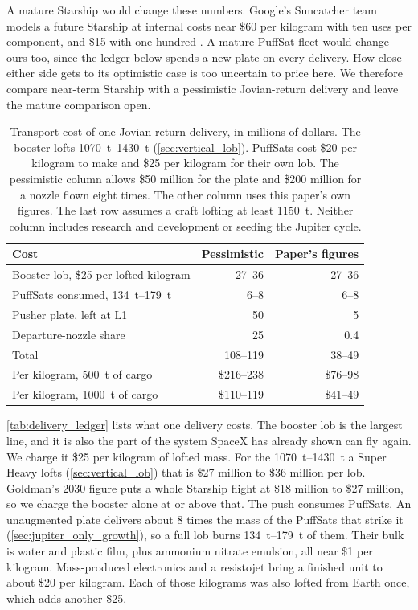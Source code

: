 \documentclass{article}
\begin{document}
A mature Starship would change these numbers. Google's Suncatcher team models a future Starship at internal costs near \$60 per kilogram with ten uses per component, and \$15 with one hundred \cite{aguera2026_suncatcher}. A mature PuffSat fleet would change ours too, since the ledger below spends a new plate on every delivery. How close either side gets to its optimistic case is too uncertain to price here. We therefore compare near-term Starship with a pessimistic Jovian-return delivery and leave the mature comparison open.

\begin{table}[!htpb]
    \centering
    \caption{Transport cost of one Jovian-return delivery, in millions of dollars. The booster lofts \SIrange{1070}{1430}{\tonne} (\autoref{sec:vertical_lob}). PuffSats cost \$20 per kilogram to make and \$25 per kilogram for their own lob. The pessimistic column allows \$50 million for the plate and \$200 million for a nozzle flown eight times. The other column uses this paper's own figures. The last row assumes a craft lofting at least \SI{1150}{\tonne}. Neither column includes research and development or seeding the Jupiter cycle.}
    \label{tab:delivery_ledger}
    \begin{tabular}{|l|r|r|}\hline
        \textbf{Cost} & \textbf{Pessimistic} & \textbf{Paper's figures} \\\hline
        Booster lob, \$25 per lofted kilogram & 27--36 & 27--36 \\\hline
        PuffSats consumed, \SIrange{134}{179}{\tonne} & 6--8 & 6--8 \\\hline
        Pusher plate, left at L1 & 50 & 5 \\\hline
        Departure-nozzle share & 25 & 0.4 \\\hline
        Total & 108--119 & 38--49 \\\hline
        Per kilogram, \SI{500}{\tonne} of cargo & \$216--238 & \$76--98 \\\hline
        Per kilogram, \SI{1000}{\tonne} of cargo & \$110--119 & \$41--49 \\\hline
    \end{tabular}
\end{table}

\autoref{tab:delivery_ledger} lists what one delivery costs. The booster lob is the largest line, and it is also the part of the system SpaceX has already shown can fly again. We charge it \$25 per kilogram of lofted mass. For the \SIrange{1070}{1430}{\tonne} a Super Heavy lofts (\autoref{sec:vertical_lob}) that is \$27 million to \$36 million per lob. Goldman's 2030 figure puts a whole Starship flight at \$18 million to \$27 million, so we charge the booster alone at or above that. The push consumes PuffSats. An unaugmented plate delivers about 8 times the mass of the PuffSats that strike it (\autoref{sec:jupiter_only_growth}), so a full lob burns \SIrange{134}{179}{\tonne} of them. Their bulk is water and plastic film, plus ammonium nitrate emulsion, all near \$1 per kilogram. Mass-produced electronics and a resistojet bring a finished unit to about \$20 per kilogram. Each of those kilograms was also lofted from Earth once, which adds another \$25.
\end{document}
